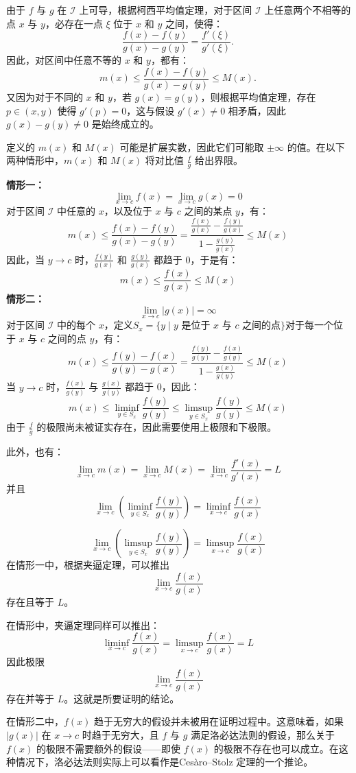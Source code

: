 由于 $f$ 与 $g$ 在 $\mathcal{I}$ 上可导，根据柯西平均值定理，对于区间 $\mathcal{I}$ 上任意两个不相等的点 $x$ 与 $y$，必存在一点 $\xi$ 位于 $x$ 和 $y$ 之间，使得：
$$
\frac{f(x) - f(y)}{g(x) - g(y)} = \frac{f'(\xi)}{g'(\xi)}.~
$$
因此，对区间中任意不等的 $x$ 和 $y$，都有：
$$
m(x) \leq \frac{f(x) - f(y)}{g(x) - g(y)} \leq M(x).~
$$
又因为对于不同的 $x$ 和 $y$，若 $g(x) = g(y)$，则根据平均值定理，存在 $p \in (x, y)$ 使得 $g'(p) = 0$，这与假设 $g'(x) \ne 0$ 相矛盾，因此 $g(x) - g(y) \ne 0$ 是始终成立的。

定义的 $m(x)$ 和 $M(x)$ 可能是扩展实数，因此它们可能取 $\pm\infty$ 的值。在以下两种情形中，$m(x)$ 和 $M(x)$ 将对比值 $\frac{f}{g}$ 给出界限。

\textbf{情形一：}
$$\lim_{x \to c} f(x) = \lim_{x \to c} g(x) = 0~$$
对于区间 $\mathcal{I}$ 中任意的 $x$，以及位于 $x$ 与 $c$ 之间的某点 $y$，有：
$$
m(x) \leq \frac{f(x) - f(y)}{g(x) - g(y)} = \frac{\frac{f(x)}{g(x)} - \frac{f(y)}{g(x)}}{1 - \frac{g(y)}{g(x)}} \leq M(x)~
$$
因此，当 $y \to c$ 时，$\frac{f(y)}{g(x)}$ 和 $\frac{g(y)}{g(x)}$ 都趋于 0，于是有：
$$
m(x) \leq \frac{f(x)}{g(x)} \leq M(x)~
$$
\textbf{情形二：}
$$
\lim_{x \to c} |g(x)| = \infty~
$$
对于区间 $\mathcal{I}$ 中的每个 $x$，定义$S_x = \{y \mid y \text{ 是位于 } x \text{ 与 } c \text{ 之间的点}\}$对于每一个位于 $x$ 与 $c$ 之间的点 $y$，有：
$$
m(x) \leq \frac{f(y) - f(x)}{g(y) - g(x)} = \frac{\frac{f(y)}{g(y)} - \frac{f(x)}{g(y)}}{1 - \frac{g(x)}{g(y)}} \leq M(x)~
$$
当 $y \to c$ 时，$\frac{f(x)}{g(y)}$ 与 $\frac{g(x)}{g(y)}$ 都趋于 0，因此：
$$
m(x) \leq \liminf_{y \in S_x} \frac{f(y)}{g(y)} \leq \limsup_{y \in S_x} \frac{f(y)}{g(y)} \leq M(x)~
$$
由于 $\frac{f}{g}$ 的极限尚未被证实存在，因此需要使用上极限和下极限。

此外，也有：
$$
\lim_{x \to c} m(x) = \lim_{x \to c} M(x) = \lim_{x \to c} \frac{f'(x)}{g'(x)} = L~
$$
并且
$$
\lim_{x \to c} \left(\liminf_{y \in S_x} \frac{f(y)}{g(y)} \right) = \liminf_{x \to c} \frac{f(x)}{g(x)}~
$$

$$
\lim_{x \to c} \left(\limsup_{y \in S_x} \frac{f(y)}{g(y)} \right) = \limsup_{x \to c} \frac{f(x)}{g(x)}~
$$
在情形一中，根据夹逼定理，可以推出 
$$\lim_{x \to c} \frac{f(x)}{g(x)}~$$ 
存在且等于 $L$。

在情形中，夹逼定理同样可以推出：
$$
\liminf_{x \to c} \frac{f(x)}{g(x)} = \limsup_{x \to c} \frac{f(x)}{g(x)} = L~
$$
因此极限 
$$\lim_{x \to c} \frac{f(x)}{g(x)}~$$ 
存在并等于 $L$。这就是所要证明的结论。

在情形二中，$f(x)$ 趋于无穷大的假设并未被用在证明过程中。这意味着，如果 $|g(x)|$ 在 $x \to c$ 时趋于无穷大，且 $f$ 与 $g$ 满足洛必达法则的假设，那么关于 $f(x)$ 的极限不需要额外的假设——即使 $f(x)$ 的极限不存在也可以成立。在这种情况下，洛必达法则实际上可以看作是Cesàro–Stolz 定理的一个推论。

